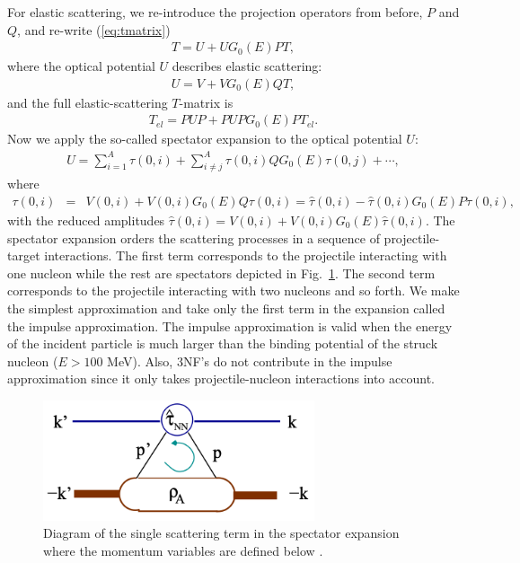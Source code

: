 \documentclass[preprintnumbers,floatfix,aps,prc,preprint,nofootinbib]{revtex4-1}
\begin{document}
For elastic scattering, we re-introduce the projection operators from before, $P$ and $Q$, and re-write (\ref{eq:tmatrix})
%
\begin{eqnarray}
	\label{eq:tmatrix_elastic}
	T = U + U G_0(E) P T,
\end{eqnarray}
%
where the optical potential $U$ describes elastic scattering:
%
\begin{eqnarray}
	\label{eq:ms_optical_potential_elastic}
	U = V + V G_0(E) Q T,
\end{eqnarray}
%
and the full elastic-scattering $T$-matrix is
%
\begin{eqnarray}
	\label{eq:tmatrix_full_elastic}
	T_{el} = P U P + P U P G_0(E) P T_{el}.
\end{eqnarray}
%
Now we apply the so-called spectator expansion to the optical potential $U$:
%
\begin{eqnarray}
	\label{eq:spec_exp}
	U = \sum_{i=1}^A \tau(0, i) + \sum_{i \neq j}^A \tau(0, i) Q G_0(E) \tau(0, j) + \cdots,
\end{eqnarray}
%
where
\begin{eqnarray}
	\label{eq:tau_equations}
	\tau(0, i) &=& V(0, i) + V(0, i) G_0(E) Q \tau(0, i) = \hat{\tau}(0, i) - \hat{\tau}(0, i) G_0(E) P \tau(0, i),
\end{eqnarray}
%
with the reduced amplitudes $\hat{\tau}(0, i) = V(0, i) + V(0, i) G_0(E) \hat{\tau}(0, i)$. The spectator expansion orders the scattering processes in a sequence of projectile-target interactions. The first term corresponds to the projectile interacting with one nucleon while the rest are spectators depicted in Fig.~\ref{fig:single_scattering}. The second term corresponds to the projectile interacting with two nucleons and so forth. We make the simplest approximation and take only the first term in the expansion called the impulse approximation. The impulse approximation is valid when the energy of the incident particle is much larger than the binding potential of the struck nucleon ($E > 100$ MeV). Also, 3NF's do not contribute in the impulse approximation since it only takes projectile-nucleon interactions into account.
\\

%
\begin{figure}
	\captionsetup{singlelinecheck=false,justification=raggedright}
	\centering
	\includegraphics[width=8cm]{single_scattering}
	\caption{Diagram of the single scattering term in the spectator expansion where the momentum variables are defined below \cite{Burrows:2018ggt}.}
	\label{fig:single_scattering}
\end{figure}
%
\end{document}
